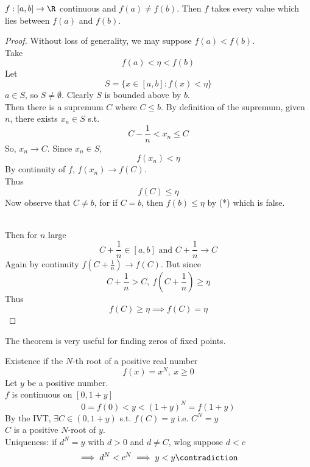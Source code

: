 \begin{theorem}
$f:[a,b]\to \R$ continuous and $f(a) \neq f(b)$. Then $f$ takes every value which lies between $f(a)$ and $f(b)$.
\begin{proof}
Without loss of generality, we may suppose $f(a)< f(b)$.\\
Take \[f(a) < \eta < f(b)\]
Let
\[S = \{x \in [a,b]: f(x) < \eta\}\]
$a\in S$, so  $S\neq \emptyset$. Clearly $S$ is bounded above by $b$.\\
Then there is a supremum $C$ where $C\leq b$. By definition of the supremum, given $n$, there exists $x_n \in S$ s.t.
\[C-\frac{1}{n} < x_n \leq C\]
So, $x_n \to C$. Since $x_n \in S$,
\[f(x_n) < \eta\]
By continuity of $f$, $f(x_n) \to f(C)$.\\
Thus 
\[f(C) \leq \eta\tag{*}\]
Now observe that $C\neq b$, for if $C = b$, then $f(b) \leq \eta$ by (*) which is false.\\


\\
Then for $n$ large
\[C + \frac{1}{n} \in [a,b]\text{ and }C + \frac{1}{n}\to C\]
Again by continuity $f(C + \frac{1}{n}) \to f(C)$. But since
\[C + \frac{1}{n} > C, \ f(C + \frac{1}{n}) \geq\eta\]
Thus 
\[f(C) \geq \eta\implies f(C) = \eta\]
\end{proof}
\end{theorem}
\begin{remark}
The theorem is very useful for finding zeros of fixed points.
\end{remark}
\begin{example}
Existence if the $N$-th root of a positive real number
\[f(x) = x^N, \ x \geq 0\]
Let $y$ be a positive number.\\
$f$ is continuous on $[0,1+y]$
\[0 = f(0)<y<(1+y)^N = f(1+y)\]
By the IVT, $\exists C \in (0,1+y)$ s.t. $f(C) = y$ i.e. $C^N = y$\\
$C$ is a positive $N$-root of $y$.\\
Uniqueness: if $d^N = y$ with $d > 0$ and $d\neq C$, wlog suppose $d< c$
\[\implies d^N < c^N \implies y < y \contradiction\]
\end{example}
